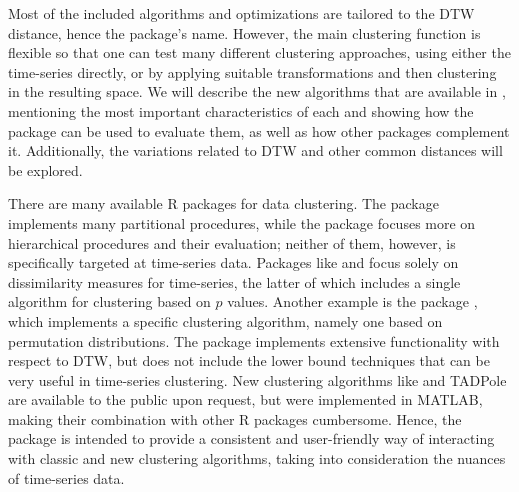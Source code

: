 Most of the included algorithms and optimizations are tailored to the DTW distance, hence the package's name.
However, the main clustering function is flexible so that one can test many different clustering approaches,
using either the time-series directly,
or by applying suitable transformations and then clustering in the resulting space.
We will describe the new algorithms that are available in \dtwclust{},
mentioning the most important characteristics of each and showing how the package can be used to evaluate them,
as well as how other packages complement it.
Additionally, the variations related to DTW and other common distances will be explored.

There are many available R packages for data clustering.
The  package \citep{leisch2006} implements many partitional procedures,
while the  package \citep{cluster} focuses more on hierarchical procedures and their evaluation;
neither of them, however, is specifically targeted at time-series data.
Packages like  \citep{tsdist} and  \citep{montero2014} focus solely on dissimilarity measures for time-series,
the latter of which includes a single algorithm for clustering based on $p$ values.
Another example is the  package \citep{brandmaier2015},
which implements a specific clustering algorithm,
namely one based on permutation distributions.
The  package \citep{giorgino2009} implements extensive functionality with respect to DTW,
but does not include the lower bound techniques that can be very useful in time-series clustering.
New clustering algorithms like \kshape{} \citep{paparrizos2015} and TADPole \citep{begum2015} are available to the public upon request,
but were implemented in MATLAB,
making their combination with other R packages cumbersome.
Hence, the \dtwclust{} package is intended to provide a consistent and user-friendly way of interacting with classic and new clustering algorithms,
taking into consideration the nuances of time-series data.

